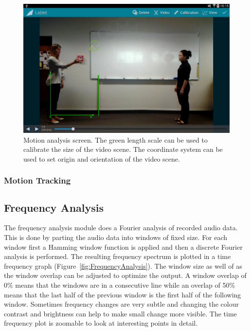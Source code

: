 \documentclass{sigchi}
\begin{document}
\begin{figure}
  \centering
  \includegraphics[width=.99\columnwidth]{MotionAnalysis}
  \caption{Motion analysis screen.  The green length scale can be used
    to calibrate the size of the video scene.  The coordinate system
    can be used to set origin and orientation of the video
    scene.\label{fig:MotionAnalysis} }
\end{figure}

\subsubsection{Motion Tracking}


\subsection{Frequency Analysis}
The frequency analysis module does a Fourier analysis of recorded
audio data.  This is done by parting the audio data into windows of
fixed size.  For each window first a Hamming window function is
applied and then a discrete Fourier analysis is performed.  The
resulting frequency spectrum is plotted in a time frequency graph
(Figure~\ref{fig:FrequencyAnalysis}).  The window size as well of as
the window overlap can be adjusted to optimize the output.  A window
overlap of 0\% means that the windows are in a consecutive line while
an overlap of 50\% means that the last half of the previous window is
the first half of the following window.  Sometimes frequency changes
are very subtle and changing the colour contrast and brightness can
help to make small change more visible.  The time frequency plot is
zoomable to look at interesting points in detail.
\end{document}
